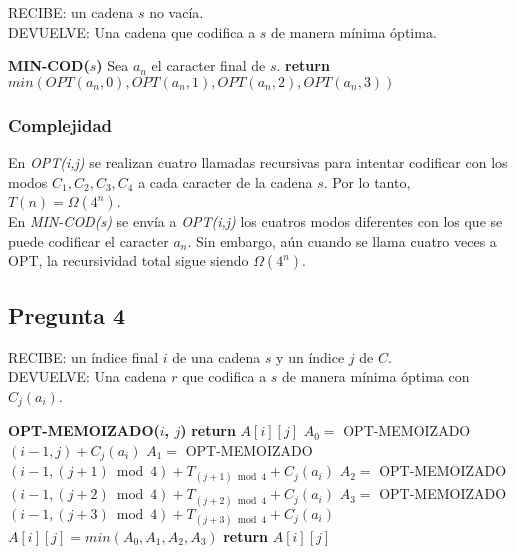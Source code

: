 \vspace{0.5cm}

\noindent RECIBE: un cadena $s$ no vacía.\\
DEVUELVE: Una cadena que codifica a $s$ de manera mínima óptima.
\begin{algorithmic}[1]
\item[]{\textbf{MIN-COD($s$)}}
\State Sea $a_n$ el caracter final de $s$.  
\State \textbf{return} $min(OPT(a_n,0), OPT(a_n,1), OPT(a_n,2), OPT(a_n,3))$  
\end{algorithmic}

\subsubsection{Complejidad}

En \emph{OPT(i,j)} se realizan cuatro llamadas recursivas para intentar codificar con los modos $C_1,C_2,C_3,C_4$ 
a cada caracter de la cadena $s$. Por lo tanto, $T(n) = \Omega(4^n)$.\\

En \emph{MIN-COD(s)} se envía a \emph{OPT(i,j)} los cuatros modos diferentes con los que se puede codificar el caracter 
$a_n$. Sin embargo, aún cuando se llama cuatro veces a OPT, la recursividad total sigue siendo $\Omega(4^n)$.

\newpage

\subsection{Pregunta 4}

\noindent RECIBE: un índice final $i$ de una cadena $s$ y un índice $j$ de $C$.\\
DEVUELVE: Una cadena $r$ que codifica a $s$ de manera mínima óptima con $C_j(a_i)$.

\begin{algorithmic}[1]
\item[]{\textbf{OPT-MEMOIZADO($i$, $j$)}}
\State \textbf{return} $A[i][j]$
\EndIf
{}
    \State $A_0 = $ OPT-MEMOIZADO$(i-1, j) + C_j(a_i)$
    \State $A_1 = $ OPT-MEMOIZADO$(i-1, (j+1)\bmod{4}) + T_{(j+1) \bmod{4}} + C_j(a_i)$
    \State $A_2 = $ OPT-MEMOIZADO$(i-1, (j+2)\bmod{4}) + T_{(j+2) \bmod{4}} + C_j(a_i)$
    \State $A_3 = $ OPT-MEMOIZADO$(i-1, (j+3)\bmod{4}) + T_{(j+3) \bmod{4}} + C_j(a_i)$
    \State $A[i][j] =min(A_0, A_1, A_2, A_3)$
\EndIf
\State \textbf{return} $A[i][j]$
\end{algorithmic}

